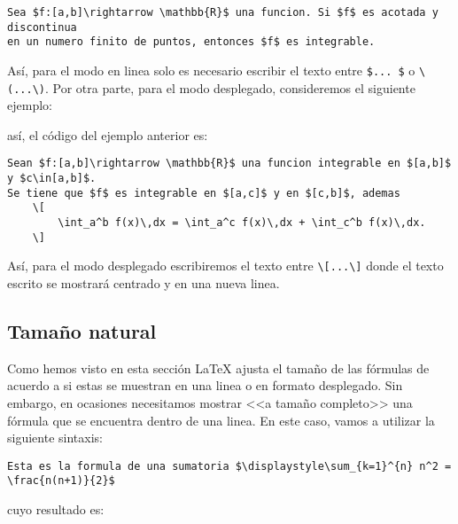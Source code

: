 \documentclass[a4,10pt]{aleph-notas}
\theoremstyle{definition}
\theoremstyle{plain}
\begin{document}
\begin{lstlisting}[frame=single]
Sea $f:[a,b]\rightarrow \mathbb{R}$ una funcion. Si $f$ es acotada y discontinua
en un numero finito de puntos, entonces $f$ es integrable.
\end{lstlisting}

Así, para el modo en linea solo es necesario escribir el texto entre \verb"$... $" o \verb"\(...\)". Por otra parte, para el modo desplegado, consideremos el siguiente ejemplo:

\begin{center}
{ \fboxsep 12pt
 }
\end{center}

así, el código del ejemplo anterior es:

\begin{lstlisting}[frame=single]
Sean $f:[a,b]\rightarrow \mathbb{R}$ una funcion integrable en $[a,b]$ y $c\in[a,b]$.
Se tiene que $f$ es integrable en $[a,c]$ y en $[c,b]$, ademas
    \[
        \int_a^b f(x)\,dx = \int_a^c f(x)\,dx + \int_c^b f(x)\,dx. 
    \]
\end{lstlisting}

Así, para el modo desplegado escribiremos el texto entre \verb"\[...\]" donde el texto escrito se mostrará centrado y en una nueva linea.

\subsection{Tamaño natural}

Como hemos visto en esta sección \LaTeX{} ajusta el tamaño de las fórmulas de acuerdo a si estas se muestran en una linea o en formato desplegado. Sin embargo, en ocasiones necesitamos mostrar <<a tamaño completo>> una fórmula que se encuentra dentro de una linea. En este caso, vamos a utilizar la siguiente sintaxis:

\begin{lstlisting}[frame=single]
Esta es la formula de una sumatoria $\displaystyle\sum_{k=1}^{n} n^2 = \frac{n(n+1)}{2}$
\end{lstlisting}

\noindent
cuyo resultado es:
\end{document}
